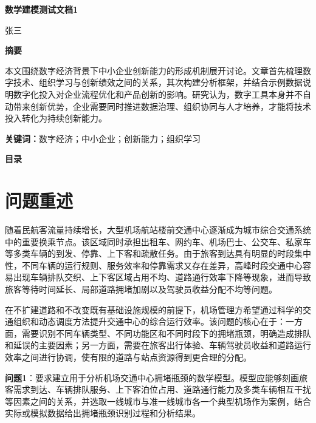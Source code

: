\documentclass[UTF8,a4paper,11pt,onecolumn,fontset=none]{ctexart}
\makeatletter
\newcommand{\customtableofcontents}{%
  \begin{center}
    {\fontsize{12pt}{14.4pt}\selectfont\bfseries 目录}
  \end{center}
  \vspace{1em}
  \@starttoc{toc}
}
\newcommand{\PaperTitle}{数学建模测试文档1}
\newcommand{\PaperAuthor}{张三}
\newcommand{\PaperAbstract}{本文围绕数字经济背景下中小企业创新能力的形成机制展开讨论。文章首先梳理数字技术、组织学习与创新绩效之间的关系，其次构建分析框架，并结合示例数据说明数字化投入对企业流程优化和产品创新的影响。研究认为，数字工具本身并不自动带来创新优势，企业需要同时推进数据治理、组织协同与人才培养，才能将技术投入转化为持续创新能力。}
\newcommand{\PaperKeywords}{数字经济；中小企业；创新能力；组织学习}
\makeatother
\begin{document}
\pagestyle{frontmatter}
\begin{titlepage}
  \thispagestyle{frontmatter}
  \centering
  \vspace*{2.5cm}
  {\bfseries \PaperTitle\par}
  \vspace{1.5cm}
  { \PaperAuthor\par}
  \vspace{2cm}

  {\bfseries 摘\quad 要\par}
  \vspace{1em}
  \begin{minipage}{0.88\textwidth}
    \PaperAbstract

    \vspace{1em}
    \noindent\textbf{关键词：}\PaperKeywords
  \end{minipage}
  \vfill
\end{titlepage}

\clearpage
\thispagestyle{frontmatter}
\customtableofcontents
\thispagestyle{frontmatter}

\clearpage
{}
\setcounter{page}{1}
\pagestyle{plain}

\section{问题重述}
随着民航客流量持续增长，大型机场航站楼前交通中心逐渐成为城市综合交通系统中的重要换乘节点。该区域同时承担出租车、网约车、机场巴士、公交车、私家车等多类车辆的到发、停靠、上下客和疏散任务。由于旅客到达具有明显的时段集中性，不同车辆的运行规则、服务效率和停靠需求又存在差异，高峰时段交通中心容易出现车辆排队交织、上下客区域占用不均、道路通行效率下降等现象，进而导致旅客等待时间延长、局部道路拥堵加剧以及驾驶员收益分配不均等问题。

在不扩建道路和不改变既有基础设施规模的前提下，机场管理方希望通过科学的交通组织和动态调度方法提升交通中心的综合运行效率。该问题的核心在于：一方面，需要识别不同车辆类型、不同功能区和不同时段下的拥堵瓶颈，明确造成排队和延误的主要因素；另一方面，需要在旅客出行体验、车辆驾驶员收益和道路运行效率之间进行协调，使有限的道路与站点资源得到更合理的分配。

\textbf{问题1}：要求建立用于分析机场交通中心拥堵瓶颈的数学模型。模型应能够刻画旅客需求到达、车辆排队服务、上下客泊位占用、道路通行能力及多类车辆相互干扰等因素之间的关系，并选取一线城市与准一线城市各一个典型机场作为案例，结合实际或模拟数据给出拥堵瓶颈识别过程和分析结果。
\end{document}
